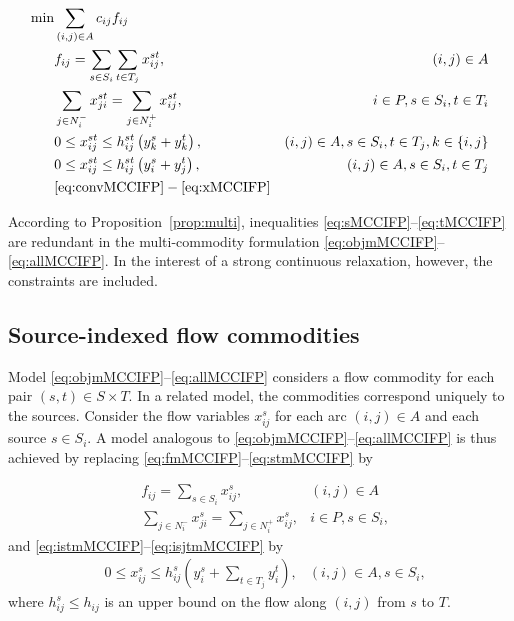 \documentclass[pdflatex,sn-mathphys-num]{sn-jnl}%
\theoremstyle{thmstyleone}%
\begin{document}
\begin{eqnarray}
\min & \sum_{(i,j)\in A}c_{ij}f_{ij} \label{eq:objmMCCIFP} \\
     & f_{ij} = \sum_{s\in S_i}\sum_{t\in T_j}x_{ij}^{st}, & (i,j)\in A \label{eq:fmMCCIFP} \\
     & \sum_{j\in N_i^-}x_{ji}^{st} = \sum_{j\in N_i^+}x_{ij}^{st}, & i\in P, s\in S_i, t\in T_i \label{eq:stmMCCIFP} \\
     & 0\leq x_{ij}^{st}\leq h_{ij}^{st}\left(y_k^s+y_k^t\right), & (i,j)\in A, s\in S_i, t\in T_j, k\in\{i,j\} \label{eq:istmMCCIFP} \\
     & 0\leq x_{ij}^{st}\leq h_{ij}^{st}\left(y_i^s+y_j^t\right), & (i,j)\in A, s\in S_i, t\in T_j \label{eq:isjtmMCCIFP} \\
     & \eqref{eq:convMCCIFP}-\eqref{eq:xMCCIFP} \label{eq:allMCCIFP}
\end{eqnarray}

According to Proposition~\ref{prop:multi}, inequalities \eqref{eq:sMCCIFP}--\eqref{eq:tMCCIFP} are redundant in the multi-commodity formulation \eqref{eq:objmMCCIFP}--\eqref{eq:allMCCIFP}.
In the interest of a strong continuous relaxation, however, the constraints are included.

\subsection{Source-indexed flow commodities} \label{sec:mciMILPsource}

Model \eqref{eq:objmMCCIFP}--\eqref{eq:allMCCIFP} considers a flow commodity for each pair $(s,t)\in S\times T$. In a related model, the commodities correspond uniquely to the sources. Consider the flow variables $x_{ij}^s$ for each arc $(i,j)\in A$ and each source $s\in S_i$. A model analogous to \eqref{eq:objmMCCIFP}--\eqref{eq:allMCCIFP} is thus achieved by replacing \eqref{eq:fmMCCIFP}--\eqref{eq:stmMCCIFP} by 

\begin{eqnarray}
     & f_{ij} = \sum_{s\in S_i}x_{ij}^s, & (i,j)\in A \label{eq:fmsMCCIFP} \\
     & \sum_{j\in N_i^-}x_{ji}^s = \sum_{j\in N_i^+}x_{ij}^s, & i\in P, s\in S_i, \label{eq:smMCCIFP}
\end{eqnarray}
and \eqref{eq:istmMCCIFP}--\eqref{eq:isjtmMCCIFP} by 
\begin{eqnarray}
     & 0\leq x_{ij}^s\leq h_{ij}^s\left(y_i^s+\sum_{t\in T_j}y_i^t\right), & (i,j)\in A, s\in S_i, \label{eq:istmsMCCIFP}
\end{eqnarray}
\noindent
where $h_{ij}^s\leq h_{ij}$ is an upper bound on the flow along $(i,j)$ from $s$ to $T$.
\end{document}
